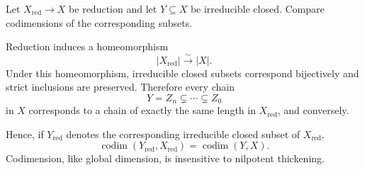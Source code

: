 \begin{problem}\label{prob:vi31-13}
Let \(X_{\mathrm{red}}\to X\) be reduction and let \(Y\subseteq X\) be irreducible closed. Compare codimensions of the corresponding subsets.
\end{problem}

\ifdefined\FullProblemDossiers
\begin{solution}
Reduction induces a homeomorphism
\[
|X_{\mathrm{red}}|\xrightarrow{\sim}|X|.
\]
Under this homeomorphism, irreducible closed subsets correspond bijectively and strict inclusions are preserved.
Therefore every chain
\[
Y=Z_n\subsetneq\cdots\subsetneq Z_0
\]
in \(X\) corresponds to a chain of exactly the same length in \(X_{\mathrm{red}}\), and conversely.

Hence, if \(Y_{\mathrm{red}}\) denotes the corresponding irreducible closed subset of \(X_{\mathrm{red}}\),
\[
\boxed{
\operatorname{codim}(Y_{\mathrm{red}},X_{\mathrm{red}})
=
\operatorname{codim}(Y,X).
}
\]
Codimension, like global dimension, is insensitive to nilpotent thickening.
\end{solution}
\fi

